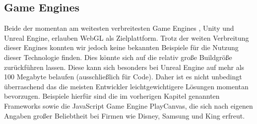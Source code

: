 \subsection{Game Engines}
Beide der momentan am weitesten verbreitesten Game Engines \cite{UnityDist}\cite{EngineDist}, Unity und Unreal Engine, erlauben WebGL als Zielplattform. Trotz der weiten Verbreitung dieser Engines konnten wir jedoch keine bekannten Beispiele für die Nutzung dieser Technologie finden. Dies könnte sich auf die relativ große Buildgröße zurückführen lassen. Diese kann sich besonders bei Unreal Engine auf mehr als 100 Megabyte belaufen (ausschließlich für Code). Daher ist es nicht unbedingt überraschend das die meisten Entwickler leichtgewichtigere Lösungen momentan bevorzugen. Beispiele hierfür sind die im vorherigen Kapitel genannten Frameworks sowie die JavaScript Game Engine PlayCanvas, die sich nach eigenen Angaben großer Beliebtheit bei Firmen wie Disney, Samsung und King erfreut.
